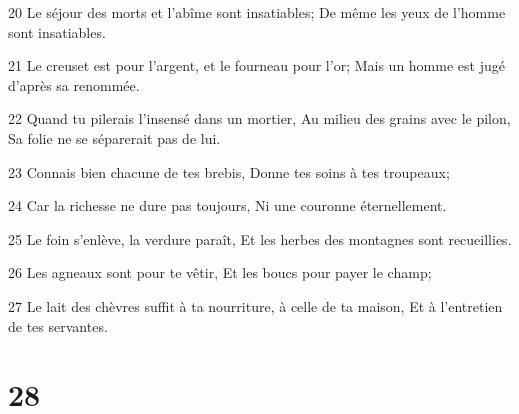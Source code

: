\par 20 Le séjour des morts et l'abîme sont insatiables; De même les yeux de l'homme sont insatiables.
\par 21 Le creuset est pour l'argent, et le fourneau pour l'or; Mais un homme est jugé d'après sa renommée.
\par 22 Quand tu pilerais l'insensé dans un mortier, Au milieu des grains avec le pilon, Sa folie ne se séparerait pas de lui.
\par 23 Connais bien chacune de tes brebis, Donne tes soins à tes troupeaux;
\par 24 Car la richesse ne dure pas toujours, Ni une couronne éternellement.
\par 25 Le foin s'enlève, la verdure paraît, Et les herbes des montagnes sont recueillies.
\par 26 Les agneaux sont pour te vêtir, Et les boucs pour payer le champ;
\par 27 Le lait des chèvres suffit à ta nourriture, à celle de ta maison, Et à l'entretien de tes servantes.

\chapter{28}

